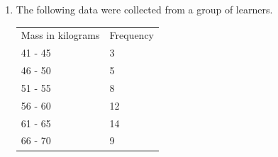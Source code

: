 \begin{description}[noitemsep]
\begin{description}[noitemsep]
\begin{enumerate}[noitemsep, label=\textbf{\arabic*}. ]
\begin{table}
\begin{center}
\begin{xtabular}[t]{|l|l|}
     \tabularnewline{}
    \end{xtabular}
      \end{center}
    \begin{center}{\small\bfseries Table 16.16}\end{center}
    \begin{caption}{\small\bfseries Table 16.16}\end{caption}
\end{table}
    \par
          \label{m39400*uid104}\item The following data were collected from a group of learners.
          \begin{table}
        \begin{center}
      \label{m39400*id215730}
    \noindent
      \tablelasttail{}
      \begin{xtabular}[t]{|l|l|}\hline
        Mass in kilograms &
        Frequency%
     \tabularnewline{}
        41 - 45 &
        3%
     \tabularnewline{}
        46 - 50 &
        5%
     \tabularnewline{}
        51 - 55 &
        8%
     \tabularnewline{}
        56 - 60 &
        12%
     \tabularnewline{}
        61 - 65 &
        14%
     \tabularnewline{}
        66 - 70 &
        9%
     \tabularnewline{}

\end{xtabular}
\end{center}
\end{table}
\end{enumerate}
\end{description}
\end{description}
